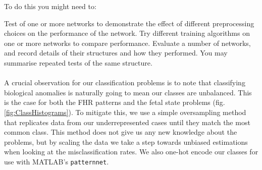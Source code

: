 \documentclass[11pt,a4paper]{article}
\begin{document}
To do this you might need to:
\begin{outline}
  \1 Test of one or more networks to demonstrate the effect of different preprocessing choices on the performance of the network.
  \1 Try different training algorithms on one or more networks to compare performance.
  \1 Evaluate a number of networks, and record details of their structures and how they performed. You may summarise repeated tests of the same structure. 
\end{outline}
\paragraph{}
A crucial observation for our classification problems is to note that classifying biological anomalies is naturally going to mean our classes are unbalanced. This is the case for both the FHR patterns and the fetal state problems (fig. \ref{fig:ClassHistograms}). To mitigate this, we use a simple oversampling method that replicates data from our underrepresented cases until they match the most common class. This method does not give us any new knowledge about the problems, but by scaling the data we take a step towards unbiased estimations when looking at the misclassification rates. We also one-hot encode our classes for use with MATLAB's \texttt{patternnet}.
\end{document}
